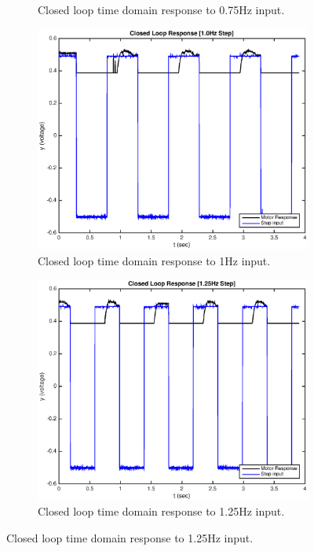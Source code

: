 \documentclass[11pt,a4paper]{article}
\begin{document}
\begin{enumerate}
\begin{figure}[H]
\begin{subfigure}{0.5\textwidth}
	  \caption{Closed loop time domain response to 0.75Hz input.}
	  \label{fig:subim2}
	  \end{subfigure}
	  
	  \begin{subfigure}{0.5\textwidth}
	  \includegraphics[width=0.9\linewidth]{Matlab_Code/Figures/D2_1_0Hz.eps}
	  \caption{Closed loop time domain response to 1Hz input.}
	  \label{fig:subim2}
	  \end{subfigure}
	  \begin{subfigure}{0.5\textwidth}
	  \includegraphics[width=0.9\linewidth]{Matlab_Code/Figures/D2_1_25Hz.eps}
	  \caption{Closed loop time domain response to 1.25Hz input.}
	  \label{fig:subim2}
	  \end{subfigure}
	  

\end{figure}
\end{enumerate}
\end{document}
